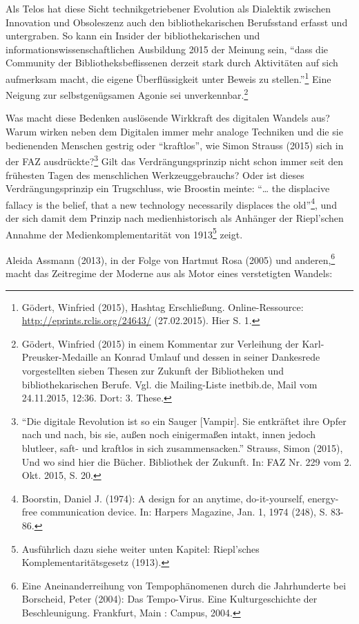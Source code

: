 \documentclass[a4paper,
fontsize=11pt,
oneside,
numbers=noperiodatend,
parskip=half-,
bibliography=totoc,
final
]{scrartcl}
\begin{document}
Als Telos hat diese Sicht technikgetriebener Evolution als Dialektik
zwischen Innovation und Obsoleszenz auch den bibliothekarischen
Berufsstand erfasst und untergraben. So kann ein Insider der
bibliothekarischen und informationswissenschaftlichen Ausbildung 2015
der Meinung sein, \enquote{dass die Community der Bibliotheksbeflissenen
derzeit stark durch Aktivitäten auf sich aufmerksam macht, die eigene
Überflüssigkeit unter Beweis zu stellen.}\footnote{Gödert, Winfried
  (2015), Hashtag Erschließung. Online-Ressource:
  \url{http://eprints.rclis.org/24643/} (27.02.2015). Hier S. 1.} Eine
Neigung zur selbstgenügsamen Agonie sei unverkennbar.\footnote{Gödert,
  Winfried (2015) in einem Kommentar zur Verleihung der
  Karl-Preusker-Medaille an Konrad Umlauf und dessen in seiner
  Dankesrede vorgestellten sieben Thesen zur Zukunft der Bibliotheken
  und bibliothekarischen Berufe. Vgl. die Mailing-Liste inetbib.de, Mail
  vom 24.11.2015, 12:36. Dort: 3. These.}

Was macht diese Bedenken auslösende Wirkkraft des digitalen Wandels aus?
Warum wirken neben dem Digitalen immer mehr analoge Techniken und die
sie bedienenden Menschen gestrig oder \enquote{kraftlos}, wie Simon
Strauss (2015) sich in der FAZ ausdrückte?\footnote{\enquote{Die
  digitale Revolution ist so ein Sauger {[}Vampir{]}. Sie entkräftet
  ihre Opfer nach und nach, bis sie, außen noch einigermaßen intakt,
  innen jedoch blutleer, saft- und kraftlos in sich zusammensacken.}
  Strauss, Simon (2015), Und wo sind hier die Bücher. Bibliothek der
  Zukunft. In: FAZ Nr. 229 vom 2. Okt. 2015, S. 20.} Gilt das
Verdrängungsprinzip nicht schon immer seit den frühesten Tagen des
menschlichen Werkzeuggebrauchs? Oder ist dieses Verdrängungsprinzip ein
Trugschluss, wie Broostin meinte: \enquote{\ldots{} the displacive
fallacy is the belief, that a new technology necessarily displaces the
old}\footnote{Boorstin, Daniel J. (1974): A design for an anytime,
  do-it-yourself, energy-free communication device. In: Harpers
  Magazine, Jan. 1, 1974 (248), S. 83-86.}, und der sich damit dem
Prinzip nach medienhistorisch als Anhänger der Riepl'schen Annahme der
Medienkomplementarität von 1913\footnote{Ausführlich dazu siehe weiter
  unten Kapitel: Riepl'sches Komplementaritätsgesetz (1913).} zeigt.

Aleida Assmann (2013), in der Folge von Hartmut Rosa (2005) und
anderen,\footnote{Eine Aneinanderreihung von Tempophänomenen durch die
  Jahrhunderte bei Borscheid, Peter (2004): Das Tempo-Virus. Eine
  Kulturgeschichte der Beschleunigung. Frankfurt, Main : Campus, 2004.}
macht das Zeitregime der Moderne aus als Motor eines verstetigten
Wandels:
\end{document}
